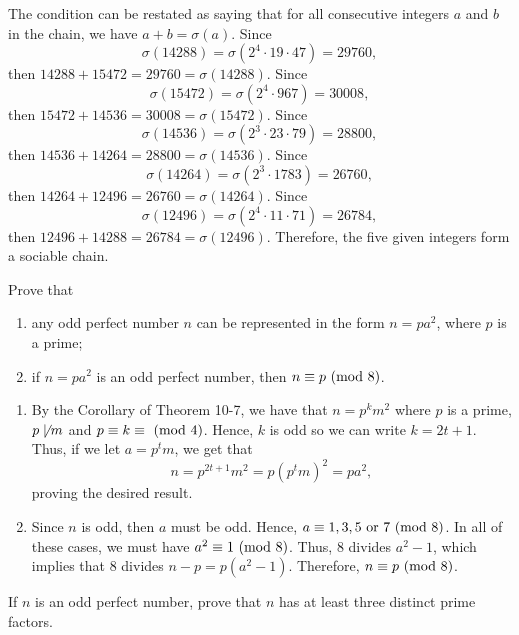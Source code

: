 \begin{solution}
    The condition can be restated as saying that for all consecutive integers $a$ and $b$ in the chain, we have $a + b = \sigma(a)$. Since 
    $$\sigma(14288) = \sigma(2^4 \cdot 19\cdot 47) = 29760,$$
    then $14288 + 15472 = 29760 = \sigma(14288)$. Since
    $$\sigma(15472) = \sigma(2^4 \cdot 967) = 30008,$$
    then $15472 +  14536 = 30008 = \sigma(15472)$. Since 
    $$\sigma(14536) = \sigma(2^3\cdot 23 \cdot 79) = 28800,$$
    then $14536 + 14264 = 28800 = \sigma(14536)$. Since
    $$\sigma(14264) = \sigma(2^3 \cdot 1783) = 26760,$$
    then $14264 + 12496 = 26760 = \sigma(14264)$. Since
    $$\sigma(12496) = \sigma(2^4 \cdot 11 \cdot 71) = 26784,$$
    then $12496 + 14288 = 26784 = \sigma(12496)$. Therefore, the five given integers form a sociable chain. \\
\end{solution}

\begin{exercise}
    Prove that
    \begin{enumerate}
        \item any odd perfect number $n$ can be represented in the form $n = pa^2$, where $p$ is a prime;
        \item if $n = pa^2$ is an odd perfect number, then $n \equiv p \ (\mathrm{mod}\ 8)$. \\
    \end{enumerate}
\end{exercise}

\begin{solution}
    \begin{enumerate}
        \item By the Corollary of Theorem 10-7, we have that $n = p^k m^2$ where $p$ is a prime, $p \not\mid m$ and $p \equiv k \equiv \ (\mathrm{mod}\ 4)$. Hence, $k$ is odd so we can write $k = 2t + 1$. Thus, if we let $a = p^tm$, we get that 
        $$n = p^{2t+1}m^2 = p(p^tm)^2 = pa^2,$$
        proving the desired result.
        \item Since $n$ is odd, then $a$ must be odd. Hence, $a \equiv 1,3,5 \text{ or } 7 \ (\mathrm{mod}\ 8)$. In all of these cases, we must have $a^2 \equiv 1 \ (\mathrm{mod}\ 8)$. Thus, 8 divides $a^2 - 1$, which implies that 8 divides $n - p = p(a^2- 1)$. Therefore, $n \equiv p \ (\mathrm{mod}\ 8)$. \\
    \end{enumerate}
\end{solution}

\begin{exercise}
    If $n$ is an odd perfect number, prove that $n$ has at least three distinct prime factors.  \\
\end{exercise}

